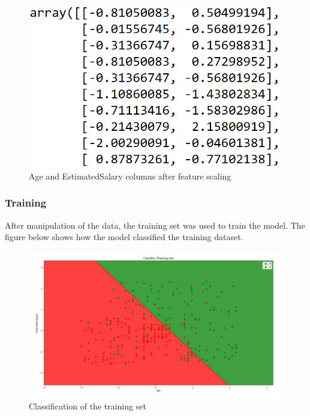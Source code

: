 \documentclass[conference]{IEEEtran}
\begin{document}
\begin{figure}[h]
    \centering
    \includegraphics[scale=0.40]{figs/AfterFscaling.png}
    \caption{Age and EstimatedSalary columns after feature scaling}
    \label{dabc}        
\end{figure}


\subsubsection{Training}
After manipulation of the data, the training set was used to train the model. The figure below shows how the model classified the training dataset.

\begin{figure}[h]
    \centering
    \includegraphics[scale=0.23]{figs/classTraining.png}
    \caption{Classification of the training set}
    \label{dabc}        
\end{figure}
\end{document}
